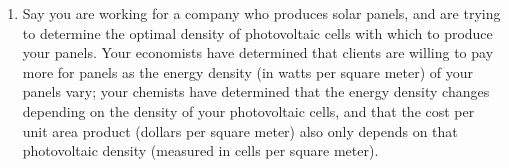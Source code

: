 \documentclass[12pt]{exam}
\begin{document}
\begin{enumerate}
\begin{enumerate}
\vfill


\newpage

\item Referring to the previous question, determine how fast the air pressure is changing for a pilot of a small plane passing through an altitude of $1,000$ feet. (Round your answer to $6$ decimal places.)

\vfill

\item Suppose that $f(x)$ and $g(x)$ are differentiable functions and that the following information about them is known:

\begin{center}
\begin{tabular}{c | c | c | c | c}
$x$ & $f(x)$ & $f'(x)$ & $g(x)$ & $g'(x)$\\
\hline
$-1$ & $2$ & $-5$ & $-3$ & $4$\\
\hline
$2$ & $-3$ & $4$ & $-1$ & $2$
\end{tabular}
\end{center}

If $C(x)$ is a function given by the formula $C(x)=f(g(x))$, determine $C'(2)$.

\vfill

\item Using the same table as in the previous question, let $D(x)$ be the function $f(f(x))$. Find $D'(-1)$.

\vfill




\end{enumerate}
\newpage

\item Say you are working for a company who produces solar panels, and are trying to determine
  the optimal density of photovoltaic cells with which to produce your panels.
  Your economists have determined that clients are willing to pay more for panels as
  the energy density (in watts per square meter) of your panels vary; 
  your chemists have determined that the energy density changes depending on the density of your
  photovoltaic cells, and that the cost per unit area product (dollars per square meter) 
  also only depends on that photovoltaic density (measured in cells per square meter).


\end{enumerate}
\end{document}
